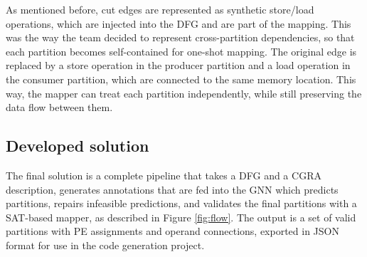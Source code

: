 As mentioned before, cut edges are represented as synthetic store/load operations, which are injected into the DFG and are part of the mapping. This was the way the team decided to represent cross-partition dependencies, so that each partition becomes self-contained for one-shot mapping. The original edge is replaced by a store operation in the producer partition and a load operation in the consumer partition, which are connected to the same memory location. This way, the mapper can treat each partition independently, while still preserving the data flow between them. 

%
%

\subsection{Developed solution}

The final solution is a complete pipeline that takes a DFG and a CGRA description, generates annotations that are fed into the GNN which predicts partitions, repairs infeasible predictions, and validates the final partitions with a SAT-based mapper, as described in Figure \ref{fig:flow}. The output is a set of valid partitions with PE assignments and operand connections, exported in JSON format for use in the code generation project.

%
%

